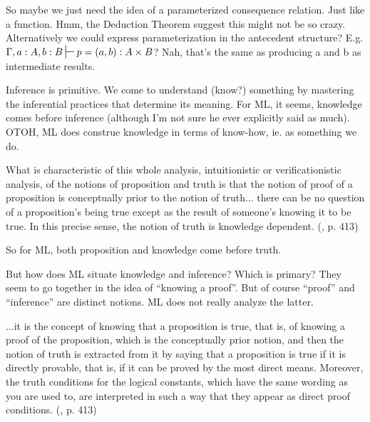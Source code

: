 \documentclass{article}
\begin{document}
So maybe we just need the idea of a parameterized consequence
relation. Just like a function. Hmm, the Deduction Theorem suggest
this might not be so crazy. Alternatively we could express
parameterization in the antecedent structure? E.g.
\(\Gamma,a:A,b:B\sststile{}{} p=(a,b): A\times B\)? Nah, that's the
same as producing a and b as intermediate results.


Inference is primitive. We come to understand (know?) something by
mastering the inferential practices that determine its meaning. For
ML, it seems, knowledge comes before inference (although I'm not sure
he ever explicitly said as much). OTOH, ML does construe knowledge in
terms of know-how, ie. as something we do.

\begin{displayquote}
What is characteristic of this whole analysis, intuitionistic or
verificationistic analysis, of the notions of proposition and truth is
that the notion of proof of a proposition is conceptually prior to the
notion of truth... there can be no question of a proposition's being
true except as the result of someone's knowing it to be true. In this
precise sense, the notion of truth is knowledge dependent.
(\parencite{martin1987truth}, p. 413)
\end{displayquote}

So for ML, both proposition and knowledge come before truth.

But how does ML situate knowledge and inference? Which is primary?
They seem to go together in the idea of ``knowing a proof''. But of
course ``proof'' and ``inference'' are distinct notions. ML does not
really analyze the latter.

\begin{displayquote}
...it is the concept of knowing that a proposition is true, that is, of
knowing a proof of the proposition, which is the conceptually prior
notion, and then the notion of truth is extracted from it by saying
that a proposition is true if it is directly provable, that is, if it
can be proved by the most direct means. Moreover, the truth conditions
for the logical constants, which have the same wording as you are used
to, are interpreted in such a way that they appear as direct proof
conditions.
(\parencite{martin1987truth}, p. 413)
\end{displayquote}
\end{document}
